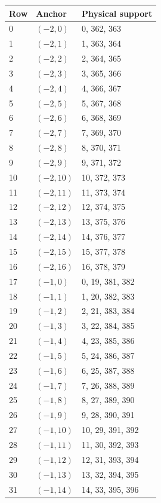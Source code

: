 \documentclass{article}
\begin{document}
\begin{longtable}{lll}
  Row & Anchor & Physical support \\
  \hline
  \endhead
  0 & \((-2, 0)\) & 0, 362, 363 \\
  1 & \((-2, 1)\) & 1, 363, 364 \\
  2 & \((-2, 2)\) & 2, 364, 365 \\
  3 & \((-2, 3)\) & 3, 365, 366 \\
  4 & \((-2, 4)\) & 4, 366, 367 \\
  5 & \((-2, 5)\) & 5, 367, 368 \\
  6 & \((-2, 6)\) & 6, 368, 369 \\
  7 & \((-2, 7)\) & 7, 369, 370 \\
  8 & \((-2, 8)\) & 8, 370, 371 \\
  9 & \((-2, 9)\) & 9, 371, 372 \\
  10 & \((-2, 10)\) & 10, 372, 373 \\
  11 & \((-2, 11)\) & 11, 373, 374 \\
  12 & \((-2, 12)\) & 12, 374, 375 \\
  13 & \((-2, 13)\) & 13, 375, 376 \\
  14 & \((-2, 14)\) & 14, 376, 377 \\
  15 & \((-2, 15)\) & 15, 377, 378 \\
  16 & \((-2, 16)\) & 16, 378, 379 \\
  17 & \((-1, 0)\) & 0, 19, 381, 382 \\
  18 & \((-1, 1)\) & 1, 20, 382, 383 \\
  19 & \((-1, 2)\) & 2, 21, 383, 384 \\
  20 & \((-1, 3)\) & 3, 22, 384, 385 \\
  21 & \((-1, 4)\) & 4, 23, 385, 386 \\
  22 & \((-1, 5)\) & 5, 24, 386, 387 \\
  23 & \((-1, 6)\) & 6, 25, 387, 388 \\
  24 & \((-1, 7)\) & 7, 26, 388, 389 \\
  25 & \((-1, 8)\) & 8, 27, 389, 390 \\
  26 & \((-1, 9)\) & 9, 28, 390, 391 \\
  27 & \((-1, 10)\) & 10, 29, 391, 392 \\
  28 & \((-1, 11)\) & 11, 30, 392, 393 \\
  29 & \((-1, 12)\) & 12, 31, 393, 394 \\
  30 & \((-1, 13)\) & 13, 32, 394, 395 \\
  31 & \((-1, 14)\) & 14, 33, 395, 396 \\

\end{longtable}
\end{document}
